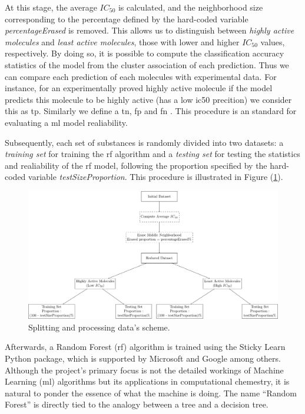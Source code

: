\documentclass[11pt]{article}
\begin{document}
At this stage, the average $IC_{50}$ is calculated, and the neighborhood size corresponding to the percentage defined by the hard-coded variable \emph{percentageErased} is removed. This allows us to distinguish between \emph{highly active molecules} and \emph{least active molecules}, those with lower and higher $IC_{50}$ values, respectively. By doing so, it is possible to compute the classification accuracy statistics of the model from the cluster association of each prediction. Thus we can compare each prediction of each molecules with experimental data. For instance, for an experimentally proved highly active molecule if the model predicts this molecule to be highly active (has a low \gls{ic50} precition) we consider this as \gls{tp}. Similarly we define a \gls{tn}, \gls{fp} and \gls{fn} . This procedure is an standard for evaluating a \gls{ml} model realiability. 

Subsequently, each set of substances is randomly divided into two datasets: a \emph{training set} for training the \gls{rf} algorithm and a \emph{testing set} for testing the statistics and realiability of the \gls{rf} model, following the proportion specified by the hard-coded variable \emph{testSizeProportion}. This procedure is illustrated in Figure (\ref{FigureDataSplittingDiagram}).

\begin{figure}[H]
\centering
\includegraphics[width = \textwidth]{GeneralSources/DataSplittingDiagram.pdf}
\caption{Splitting and processing data's scheme.}
\label{FigureDataSplittingDiagram}
\end{figure}

Afterwards, a Random Forest (\gls{rf}) algorithm is trained using the Sticky Learn \cite{PythonPackageStickitLearn} Python package, which is supported by Microsoft and Google among others. Although the project’s primary focus is not the detailed workings of Machine Learning (\gls{ml}) algorithms but its applications in computational chemestry, it is natural to ponder the essence of what the machine is doing. The name “Random Forest” is directly tied to the analogy between a tree and a decision tree. \par
\end{document}
